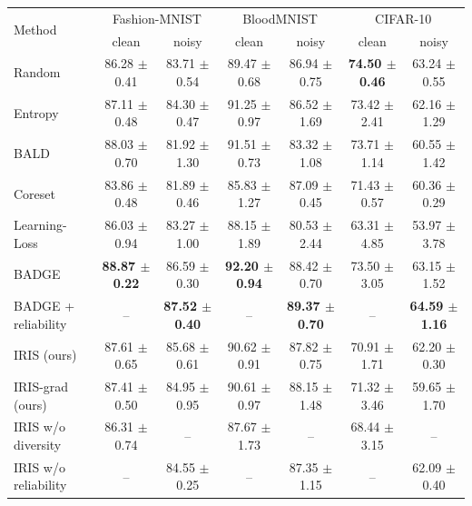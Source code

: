 \begin{tabular}{@{}lcccccc@{}}
\toprule
\multirow{2}{*}{Method} & \multicolumn{2}{c}{Fashion-MNIST} & \multicolumn{2}{c}{BloodMNIST} & \multicolumn{2}{c}{CIFAR-10} \\
 & clean & noisy & clean & noisy & clean & noisy \\
\midrule
Random & 86.28 $\pm$ 0.41 & 83.71 $\pm$ 0.54 & 89.47 $\pm$ 0.68 & 86.94 $\pm$ 0.75 & \textbf{74.50 $\pm$ 0.46} & 63.24 $\pm$ 0.55 \\
Entropy & 87.11 $\pm$ 0.48 & 84.30 $\pm$ 0.47 & 91.25 $\pm$ 0.97 & 86.52 $\pm$ 1.69 & 73.42 $\pm$ 2.41 & 62.16 $\pm$ 1.29 \\
BALD & 88.03 $\pm$ 0.70 & 81.92 $\pm$ 1.30 & 91.51 $\pm$ 0.73 & 83.32 $\pm$ 1.08 & 73.71 $\pm$ 1.14 & 60.55 $\pm$ 1.42 \\
Coreset & 83.86 $\pm$ 0.48 & 81.89 $\pm$ 0.46 & 85.83 $\pm$ 1.27 & 87.09 $\pm$ 0.45 & 71.43 $\pm$ 0.57 & 60.36 $\pm$ 0.29 \\
Learning-Loss & 86.03 $\pm$ 0.94 & 83.27 $\pm$ 1.00 & 88.15 $\pm$ 1.89 & 80.53 $\pm$ 2.44 & 63.31 $\pm$ 4.85 & 53.97 $\pm$ 3.78 \\
BADGE & \textbf{88.87 $\pm$ 0.22} & 86.59 $\pm$ 0.30 & \textbf{92.20 $\pm$ 0.94} & 88.42 $\pm$ 0.70 & 73.50 $\pm$ 3.05 & 63.15 $\pm$ 1.52 \\
BADGE + reliability & -- & \textbf{87.52 $\pm$ 0.40} & -- & \textbf{89.37 $\pm$ 0.70} & -- & \textbf{64.59 $\pm$ 1.16} \\
\midrule
IRIS (ours) & 87.61 $\pm$ 0.65 & 85.68 $\pm$ 0.61 & 90.62 $\pm$ 0.91 & 87.82 $\pm$ 0.75 & 70.91 $\pm$ 1.71 & 62.20 $\pm$ 0.30 \\
IRIS-grad (ours) & 87.41 $\pm$ 0.50 & 84.95 $\pm$ 0.95 & 90.61 $\pm$ 0.97 & 88.15 $\pm$ 1.48 & 71.32 $\pm$ 3.46 & 59.65 $\pm$ 1.70 \\
IRIS w/o diversity & 86.31 $\pm$ 0.74 & -- & 87.67 $\pm$ 1.73 & -- & 68.44 $\pm$ 3.15 & -- \\
IRIS w/o reliability & -- & 84.55 $\pm$ 0.25 & -- & 87.35 $\pm$ 1.15 & -- & 62.09 $\pm$ 0.40 \\
\bottomrule
\end{tabular}
